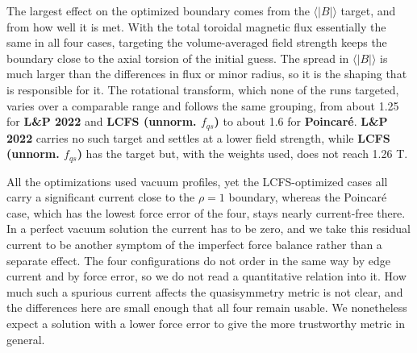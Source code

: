 \documentclass{jpp}
\begin{document}
The largest effect on the optimized boundary comes from the $\langle |B| \rangle$ target, and from how well it is met. With the total toroidal magnetic flux essentially the same in all four cases, targeting the volume-averaged field strength keeps the boundary close to the axial torsion of the initial guess. The spread in $\langle |B| \rangle$ is much larger than the differences in flux or minor radius, so it is the shaping that is responsible for it. The rotational transform, which none of the runs targeted, varies over a comparable range and follows the same grouping, from about 1.25 for \textbf{L\&P 2022} and \textbf{LCFS (unnorm. $f_{qs}$)} to about 1.6 for \textbf{Poincaré}. \textbf{L\&P 2022} carries no such target and settles at a lower field strength, while \textbf{LCFS (unnorm. $f_{qs}$)} has the target but, with the weights used, does not reach 1.26 T.

All the optimizations used vacuum profiles, yet the LCFS-optimized cases all carry a significant current close to the $\rho=1$ boundary, whereas the Poincaré case, which has the lowest force error of the four, stays nearly current-free there. In a perfect vacuum solution the current has to be zero, and we take this residual current to be another symptom of the imperfect force balance rather than a separate effect. The four configurations do not order in the same way by edge current and by force error, so we do not read a quantitative relation into it. How much such a spurious current affects the quasisymmetry metric is not clear, and the differences here are small enough that all four remain usable. We nonetheless expect a solution with a lower force error to give the more trustworthy metric in general.




\end{document}
